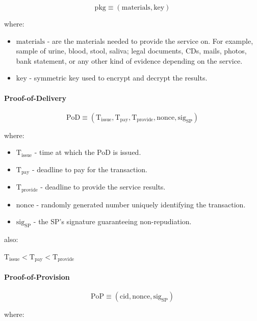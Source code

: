 \documentclass{ieeeaccess}
\begin{document}
$$\mathrm{pkg} \equiv (\mathrm{materials}, \mathrm{key})$$

where:

\begin{itemize}

\item $\mathrm{materials}$ - are the materials needed to provide the
  service on. For example, sample of urine, blood, stool, saliva; legal
  documents, CDs, mails, photos, bank statement, or any other kind of
  evidence depending on the service.
\item $\mathrm{key}$ - symmetric key used to encrypt and decrypt the
  results.
\end{itemize}

\paragraph{Proof-of-Delivery}\label{proof-of-delivery}

$$\mathrm{PoD} \equiv (\mathrm{T}_\mathrm{issue}, \mathrm{T}_\mathrm{pay}, \mathrm{T}_\mathrm{provide}, \mathrm{nonce}, \mathrm{sig}_\mathrm{SP})$$

where:

\begin{itemize}

\item $\mathrm{T}_\mathrm{issue}$ - time at which the PoD is issued.
\item
  $\mathrm{T}_\mathrm{pay}$ - deadline to pay for the transaction.
\item
  $\mathrm{T}_\mathrm{provide}$ - deadline to provide the service
  results.
\item $\mathrm{nonce}$ - randomly generated number uniquely identifying
  the transaction.
\item $\mathrm{sig}_\mathrm{SP}$ - the SP's signature guaranteeing
  non-repudiation.
\end{itemize}

also:

\(\mathrm{T}_\mathrm{issue} < \mathrm{T}_\mathrm{pay} < \mathrm{T}_\mathrm{provide}\)

\paragraph{Proof-of-Provision}\label{proof-of-provision}

\[\mathrm{PoP} \equiv (\mathrm{cid}, \mathrm{nonce}, \mathrm{sig}_\mathrm{SP})\]

where:
\end{document}
